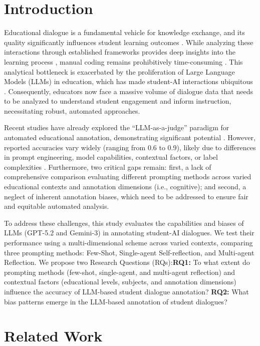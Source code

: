 \documentclass[runningheads]{llncs}
\begin{document}
\section{Introduction}
Educational dialogue is a fundamental vehicle for knowledge exchange, and its quality significantly influences student learning outcomes \cite{muhonen2018quality,howe2019teacher,hao_mapping_2026}. While analyzing these interactions through established frameworks provides deep insights into the learning process \cite{hennessy2016developing}, manual coding remains prohibitively time-consuming \cite{long2024evaluating}. This analytical bottleneck is exacerbated by the proliferation of Large Language Models (LLMs) in education, which has made student-AI interactions ubiquitous \cite{kasneci2023chatgpt}. Consequently, educators now face a massive volume of dialogue data that needs to be analyzed to understand student engagement and inform instruction, necessitating robust, automated approaches.

Recent studies have already explored the ``LLM-as-a-judge'' paradigm for automated educational annotation, demonstrating significant potential \cite{long2024evaluating,he2025automated,nguyen2025applying,jiang2025uncovering}. However, reported accuracies vary widely (ranging from 0.6 to 0.9), likely due to differences in prompt engineering, model capabilities, contextual factors, or label complexities \cite{nguyen2025applying,he2025automated}. Furthermore, two critical gaps remain: first, a lack of comprehensive comparison evaluating different prompting methods across varied educational contexts and annotation dimensions (i.e., cognitive); and second, a neglect of inherent annotation biases, which need to be addressed to ensure fair and equitable automated analysis.

To address these challenges, this study evaluates the capabilities and biases of LLMs (GPT-5.2 and Gemini-3) in annotating student-AI dialogues. We test their performance using a multi-dimensional scheme across varied contexts, comparing three prompting methods: Few-Shot, Single-agent Self-reflection, and Multi-agent Reflection. We propose two Research Questions (RQs):\textbf{RQ1:} To what extent do prompting methods (few-shot, single-agent, and multi-agent reflection) and contextual factors (educational levels, subjects, and annotation dimensions) influence the accuracy of LLM-based student dialogue annotation? \textbf{RQ2:} What bias patterns emerge in the LLM-based annotation of student dialogues?

\section{Related Work}
\end{document}
